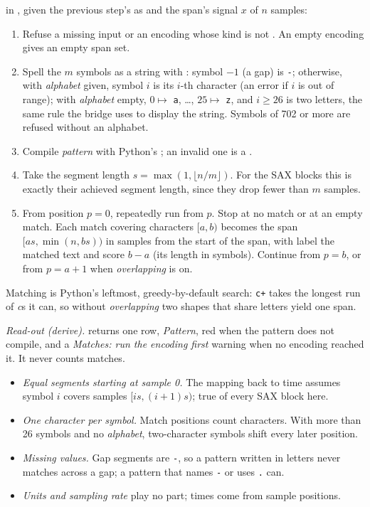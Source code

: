  in , given the previous step's
 as  and the span's signal $x$ of $n$ samples:
\begin{enumerate}
\item Refuse a missing input or an encoding whose kind is not . An empty
  encoding gives an empty span set.
\item Spell the $m$ symbols as a string with : symbol $-1$ (a gap) is
  \texttt{-}; otherwise, with \emph{alphabet} given, symbol $i$ is its $i$-th character
  (an error if $i$ is out of range); with \emph{alphabet} empty, $0\mapsto$ \texttt{a},
  \ldots, $25\mapsto$ \texttt{z}, and $i\geq 26$ is two letters, the same rule the bridge
  uses to display the string. Symbols of 702 or more are refused without an alphabet.
\item Compile \emph{pattern} with Python's ; an invalid one is a
  .
\item Take the segment length $s = \max(1, \lfloor n/m\rfloor)$. For the SAX blocks this is
  exactly their achieved segment length, since they drop fewer than $m$ samples.
\item From position $p = 0$, repeatedly run  from $p$. Stop at no match or
  at an empty match. Each match covering characters $[a, b)$ becomes the span
  $[as, \min(n, bs))$ in samples from the start of the span, with label the matched text
  and score $b-a$ (its length in symbols). Continue from $p = b$, or from $p = a+1$ when
  \emph{overlapping} is on.
\end{enumerate}
Matching is Python's leftmost, greedy-by-default search: \texttt{c+} takes the longest run
of \emph{c}s it can, so without \emph{overlapping} two shapes that share letters yield one
span.

\emph{Read-out (derive).}  returns one row, \emph{Pattern}, red when the
pattern does not compile, and a \emph{Matches: run the encoding first} warning when no
encoding reached it. It never counts matches.

\begin{itemize}
\item \emph{Equal segments starting at sample 0.} The mapping back to time assumes symbol
  $i$ covers samples $[is, (i+1)s)$; true of every SAX block here.
\item \emph{One character per symbol.} Match positions count characters. With more than 26
  symbols and no \emph{alphabet}, two-character symbols shift every later position.
\item \emph{Missing values.} Gap segments are \texttt{-}, so a pattern written in letters
  never matches across a gap; a pattern that names \texttt{-} or uses \texttt{.} can.
\item \emph{Units and sampling rate} play no part; times come from sample positions.
\end{itemize}

